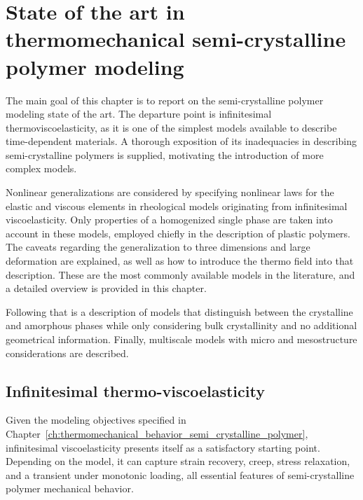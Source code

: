 \chapter{State of the art in thermomechanical semi-crystalline polymer modeling} \label{ch:modeling_semi_crystalline_polymer}

The main goal of this chapter is to report on the semi-crystalline polymer modeling state of the art.
The departure point is infinitesimal thermoviscoelasticity, as it is one of the simplest models available to describe time-dependent materials.
A thorough exposition of its inadequacies in describing semi-crystalline polymers is supplied, motivating the introduction of more complex models.

Nonlinear generalizations are considered by specifying nonlinear laws for the elastic and viscous elements in rheological models originating from infinitesimal viscoelasticity.
Only properties of a homogenized single phase are taken into account in these models, employed chiefly in the description of plastic polymers.
The caveats regarding the generalization to three dimensions and large deformation are explained, as well as how to introduce the thermo field into that description.
These are the most commonly available models in the literature, and a detailed overview is provided in this chapter.

Following that is a description of models that distinguish between the crystalline and amorphous phases while only considering bulk crystallinity and no additional geometrical information.
Finally, multiscale models with micro and mesostructure considerations are described.

\section{Infinitesimal thermo-viscoelasticity}
\label{sec:infinitesimal_thermo_viscoelasticity}
Given the modeling objectives specified in Chapter~\ref{ch:thermomechanical_behavior_semi_crystalline_polymer}, infinitesimal viscoelasticity presents itself as a satisfactory starting point.
Depending on the model, it can capture strain recovery, creep, stress relaxation, and a transient under monotonic loading, all essential features of semi-crystalline polymer mechanical behavior.

